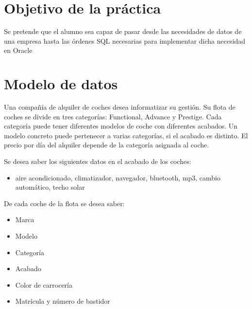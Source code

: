 
\usepackage{eurosym}





\renewcommand{\hmwkTitle}{Diseño E/R, paso a SQL e inserción de datos}


\usepackage{blindtext}






\primerapagina

\setlength{\parindent}{2em}
\setlength{\parskip}{1em}

\section{Objetivo de la práctica}
Se pretende que el alumno sea capaz de pasar desde las necesidades de datos de una empresa hasta las órdenes SQL necesarias para implementar dicha necesidad en Oracle

\section{Modelo de datos}
Una compañía de alquiler de coches desea informatizar su gestión.
Su flota de coches se divide en tres categorías: Functional, Advance y
Prestige. Cada categoría puede tener diferentes modelos de coche
con diferentes acabados. Un modelo concreto puede pertenecer a
varias categorías, si el acabado es distinto. El precio por día del
alquiler depende de la categoría asignada al coche.

Se desea saber los siguientes datos en el acabado de los coches:
\begin{itemize}
\item aire acondicionado, climatizador, navegador, bluetooth, mp3,
cambio automático, techo solar
\end{itemize}

De cada coche de la flota se desea saber:
\begin{itemize}
\item Marca
\item Modelo
\item Categoría
\item Acabado
\item Color de carrocería
\item Matrícula y número de bastidor
\end{itemize}

